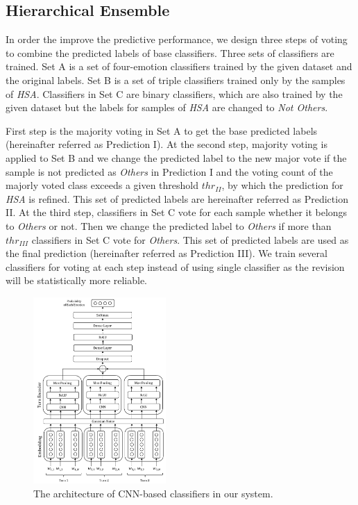 \documentclass[11pt,a4paper]{article}
\begin{document}
\subsection{Hierarchical Ensemble}
\label{ssec:ensemble}

In order the improve the predictive performance, we design three steps of voting to combine the predicted labels of base classifiers. Three sets of classifiers are trained. Set A is a set of four-emotion classifiers trained by the given dataset and the original labels. Set B is a set of triple classifiers trained only by the samples of {\em HSA}. Classifiers in Set C are binary classifiers, which are also trained by the given dataset but the labels for samples of {\em HSA} are changed to {\em Not Others}. 

First step is the majority voting in Set A to get the base predicted labels (hereinafter referred as Prediction I). At the second step, majority voting is applied to Set B and we change the predicted label to the new major vote if the sample is not predicted as {\em Others} in Prediction I and the voting count of the majorly voted class exceeds a given threshold $thr_{II}$, by which the prediction for {\em HSA} is refined. This set of predicted labels are hereinafter referred as Prediction II. At the third step, classifiers in Set C vote for each sample whether it belongs to {\em Others} or not. Then we change the predicted label to {\em Others} if more than $thr_{III}$ classifiers in Set C vote for {\em Others}. This set of predicted labels are used as the final prediction (hereinafter referred as Prediction III). We train several classifiers for voting at each step instead of using single classifier as the revision will be statistically more reliable.

\begin{figure}
\begin{center}
\includegraphics[width=0.45\textwidth]{framework_vertical.pdf}
\caption{\label{fig:classifier} The architecture of CNN-based classifiers in our system.}
\end{center}
\end{figure}
\end{document}
